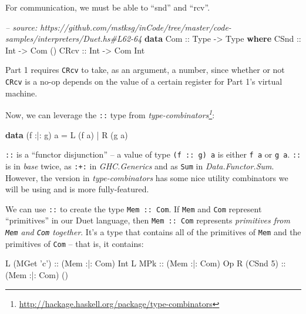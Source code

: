 \documentclass[]{article}
\newenvironment{Shaded}{}{}
\newcommand{\KeywordTok}[1]{\textcolor[rgb]{0.00,0.44,0.13}{\textbf{#1}}}
\newcommand{\DataTypeTok}[1]{\textcolor[rgb]{0.56,0.13,0.00}{#1}}
\newcommand{\DecValTok}[1]{\textcolor[rgb]{0.25,0.63,0.44}{#1}}
\newcommand{\CharTok}[1]{\textcolor[rgb]{0.25,0.44,0.63}{#1}}
\newcommand{\CommentTok}[1]{\textcolor[rgb]{0.38,0.63,0.69}{\textit{#1}}}
\newcommand{\OtherTok}[1]{\textcolor[rgb]{0.00,0.44,0.13}{#1}}
\newcommand{\FunctionTok}[1]{\textcolor[rgb]{0.02,0.16,0.49}{#1}}
\newcommand{\NormalTok}[1]{#1}
\renewcommand{\href}[2]{#2\footnote{\url{#1}}}
\begin{document}
For communication, we must be able to ``snd'' and ``rcv''.

\begin{Shaded}
\begin{Highlighting}[]
\CommentTok{-- source: https://github.com/mstksg/inCode/tree/master/code-samples/interpreters/Duet.hs#L62-64}
\KeywordTok{data} \DataTypeTok{Com}\OtherTok{ ::} \DataTypeTok{Type} \OtherTok{->} \DataTypeTok{Type} \KeywordTok{where}
    \DataTypeTok{CSnd}\OtherTok{ ::} \DataTypeTok{Int} \OtherTok{->} \DataTypeTok{Com}\NormalTok{ ()}
    \DataTypeTok{CRcv}\OtherTok{ ::} \DataTypeTok{Int} \OtherTok{->} \DataTypeTok{Com} \DataTypeTok{Int}
\end{Highlighting}
\end{Shaded}

Part 1 requires \texttt{CRcv} to take, as an argument, a number, since whether
or not \texttt{CRcv} is a no-op depends on the value of a certain register for
Part 1's virtual machine.

Now, we can leverage the \texttt{:\textbar{}:} type from
\emph{\href{http://hackage.haskell.org/package/type-combinators}{type-combinators}}:

\begin{Shaded}
\begin{Highlighting}[]
\KeywordTok{data}\NormalTok{ (f }\FunctionTok{:|:}\NormalTok{ g) a }\FunctionTok{=} \DataTypeTok{L}\NormalTok{ (f a)}
                 \FunctionTok{|} \DataTypeTok{R}\NormalTok{ (g a)}
\end{Highlighting}
\end{Shaded}

\texttt{:\textbar{}:} is a ``functor disjunction'' -- a value of type
\texttt{(f\ :\textbar{}:\ g)\ a} is either \texttt{f\ a} or \texttt{g\ a}.
\texttt{:\textbar{}:} is in \emph{base} twice, as \texttt{:+:} in
\emph{GHC.Generics} and as \texttt{Sum} in \emph{Data.Functor.Sum}. However, the
version in \emph{type-combinators} has some nice utility combinators we will be
using and is more fully-featured.

We can use \texttt{:\textbar{}:} to create the type
\texttt{Mem\ :\textbar{}:\ Com}. If \texttt{Mem} and \texttt{Com} represent
``primitives'' in our Duet language, then \texttt{Mem\ :\textbar{}:\ Com}
represents \emph{primitives from \texttt{Mem} and \texttt{Com} together}. It's a
type that contains all of the primitives of \texttt{Mem} and the primitives of
\texttt{Com} -- that is, it contains:

\begin{Shaded}
\begin{Highlighting}[]
\DataTypeTok{L}\NormalTok{ (}\DataTypeTok{MGet} \CharTok{'c'}\NormalTok{)}\OtherTok{ ::}\NormalTok{ (}\DataTypeTok{Mem} \FunctionTok{:|:} \DataTypeTok{Com}\NormalTok{) }\DataTypeTok{Int}
\DataTypeTok{L} \DataTypeTok{MPk}\OtherTok{        ::}\NormalTok{ (}\DataTypeTok{Mem} \FunctionTok{:|:} \DataTypeTok{Com}\NormalTok{) }\DataTypeTok{Op}
\DataTypeTok{R}\NormalTok{ (}\DataTypeTok{CSnd} \DecValTok{5}\NormalTok{)}\OtherTok{   ::}\NormalTok{ (}\DataTypeTok{Mem} \FunctionTok{:|:} \DataTypeTok{Com}\NormalTok{) ()}
\end{Highlighting}
\end{Shaded}
\end{document}
